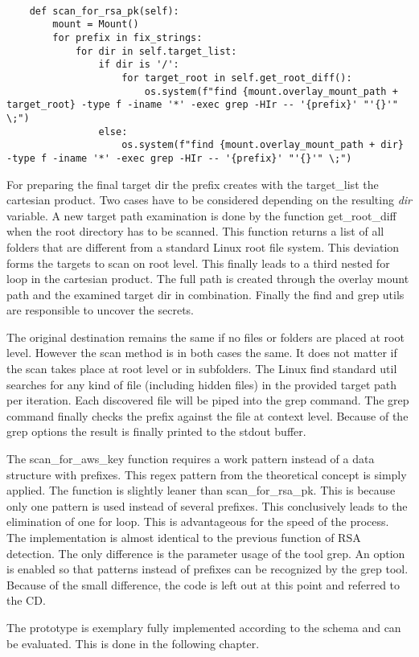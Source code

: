 \lstset{language=Python}          
\begin{lstlisting}[]  % Start your code-block
		
    def scan_for_rsa_pk(self):
        mount = Mount()
        for prefix in fix_strings:
            for dir in self.target_list:
                if dir is '/':
                    for target_root in self.get_root_diff():
                        os.system(f"find {mount.overlay_mount_path + target_root} -type f -iname '*' -exec grep -HIr -- '{prefix}' "'{}'" \;")
                else:
                    os.system(f"find {mount.overlay_mount_path + dir} -type f -iname '*' -exec grep -HIr -- '{prefix}' "'{}'" \;")
\end{lstlisting}
For preparing the final target dir the prefix creates with the target\_list the cartesian product. 
Two cases have to be considered depending on the resulting \textit{dir} variable. 
A new target path examination is done by the function get\_root\_diff when the root directory has to be scanned. 
This function returns a list of all folders that are different from a standard Linux root file system. 
This deviation forms the targets to scan on root level. This finally leads to a third nested for loop in the cartesian product. 
The full path is created through the overlay mount path and the examined target dir in combination. 
Finally the find and grep utils are responsible to uncover the secrets.

The original destination remains the same if no files or folders are placed at root level.
However the scan method is in both cases the same. It does not matter if the scan takes place at root level or in subfolders.
The Linux find standard util searches for any kind of file (including hidden files) in the provided target path per iteration.
Each discovered file will be piped into the grep command. The grep command finally checks the prefix against the file at context level. 
Because of the grep options the result is finally printed to the stdout buffer.

The scan\_for\_aws\_key function requires a work pattern instead of a data structure with prefixes. 
This regex pattern from the theoretical concept is simply applied.
The function is slightly leaner than scan\_for\_rsa\_pk. 
This is because only one pattern is used instead of several prefixes. 
This conclusively leads to the elimination of one for loop.
This is advantageous for the speed of the process. 
The implementation is almost identical to the previous function of RSA detection. 
The only difference is the parameter usage of the tool grep. 
An option is enabled so that patterns instead of prefixes can be recognized by the grep tool.
Because of the small difference, the code is left out at this point and referred to the CD.

The prototype is exemplary fully implemented according to the schema and can be evaluated. This is done in the following chapter.